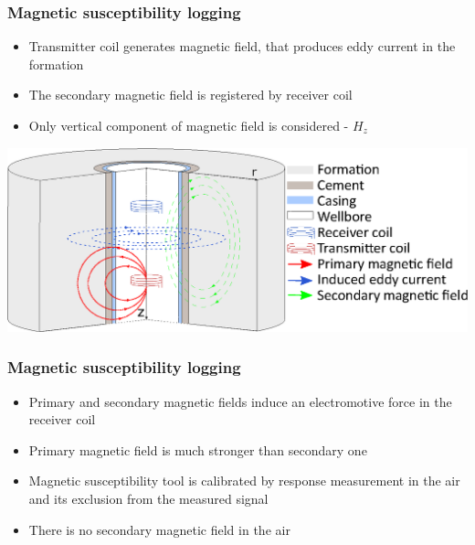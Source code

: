\documentclass[aspectratio=169]{beamer}
\begin{document}
\begin{frame}
\frametitle{Magnetic susceptibility logging}
\begin{itemize}
\item Transmitter coil generates magnetic field, that produces eddy current in the formation 
\item The secondary magnetic field is registered by receiver coil
\item Only vertical component of magnetic field is considered - $H_z$
\end{itemize}
\begin{center}
\includegraphics[scale=0.62]{Borehole_big.eps}
\end{center}
\end{frame}
%
%
\begin{frame}
\frametitle{Magnetic susceptibility logging}
\begin{itemize}
\item Primary and secondary magnetic fields induce an electromotive force in the receiver coil
\item Primary magnetic field is much stronger than secondary one
\item Magnetic susceptibility tool is calibrated by response measurement in the air and its exclusion from the measured signal 
\item There is no secondary magnetic field in the air
\end{itemize}
\end{frame}
%
%
\end{document}

